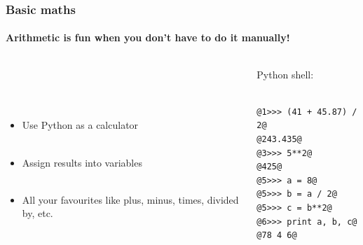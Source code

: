 \documentclass[handout]{beamer}
\begin{document}
\begin{frame}[fragile]
\frametitle{Basic maths}
\framesubtitle{Arithmetic is fun when you don't have to do it manually!}
\large
  \begin{columns}[T]
    \begin{column}{.5\textwidth} 
\ \\ 

\ \\ 

\ \\ 


\begin{itemize}



 \item Use Python as a calculator\\ \
 \item  Assign results into variables \\ \

 \item All your favourites like plus, minus, times, divided by, etc. \\ \


\end{itemize}
     \end{column}
     
         \begin{column}{.5\textwidth} 
         Python shell: \\ \
\begin{lstlisting}[style=base]
@1>>> (41 + 45.87) / 2@
@243.435@
@3>>> 5**2@
@425@
@5>>> a = 8@
@5>>> b = a / 2@
@5>>> c = b**2@
@6>>> print a, b, c@
@78 4 6@
\end{lstlisting}

    \end{column}
    \end{columns}

\end{frame}
\end{document}
